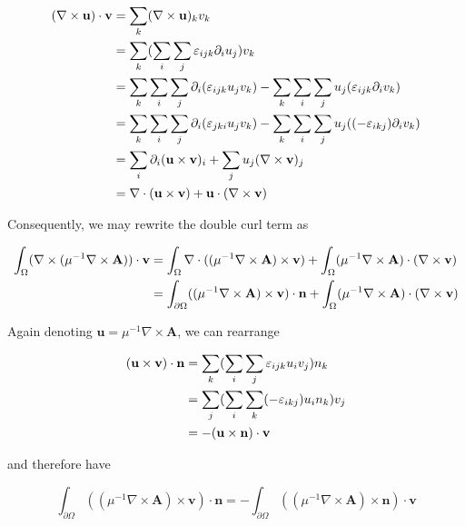 \documentclass[11pt, a4paper]{article}
\begin{document}
\begin{align}
    (\nabla \times \mathbf{u}) \cdot \mathbf{v} &= \sum_k (\nabla \times \mathbf{u})_k v_k \notag \\ 
    &= \sum_k (\sum_i \sum_j \varepsilon_{ijk} \partial_i u_j) v_k \notag \\ 
    &= \sum_k \sum_i \sum_j \partial_i (\varepsilon_{ijk} u_j v_k) - \sum_k \sum_i \sum_j u_j (\varepsilon_{ijk} \partial_i v_k) \notag \\ 
    &= \sum_k \sum_i \sum_j \partial_i (\varepsilon_{jki} u_j v_k) - \sum_k \sum_i \sum_j u_j ((-\varepsilon_{ikj}) \partial_i v_k) \notag \\ 
    &= \sum_i \partial_i (\mathbf{u} \times \mathbf{v})_i + \sum_j u_j (\nabla \times \mathbf{v})_j \notag \\ 
    &= \nabla \cdot (\mathbf{u} \times \mathbf{v}) + \mathbf{u} \cdot (\nabla \times \mathbf{v}) \label{equ:curlidentity} 
\end{align}

Consequently, we may rewrite the double curl term as 

\begin{align}
    \int_{\Omega} (\nabla \times ({\mu^{-1} \nabla \times \mathbf{A}})) \cdot \mathbf{v} &=
    \int_{\Omega} \nabla \cdot (({\mu^{-1} \nabla \times \mathbf{A}}) \times \mathbf{v})
    + \int_{\Omega} ({\mu^{-1} \nabla \times \mathbf{A}}) \cdot (\nabla \times \mathbf{v}) \notag \\
    &= \int_{\partial \Omega} (({\mu^{-1} \nabla \times \mathbf{A}}) \times \mathbf{v}) \cdot \mathbf{n}
    + \int_{\Omega} ({\mu^{-1} \nabla \times \mathbf{A}}) \cdot (\nabla \times \mathbf{v}) \notag \\
\end{align}

Again denoting $\mathbf{u} = \mu^{-1} \nabla \times \mathbf{A}$, we can rearrange 

\begin{align}
    (\mathbf{u} \times \mathbf{v}) \cdot \mathbf{n} &= \sum_k (\sum_i \sum_j \varepsilon_{ijk} u_i v_j) n_k \notag \\
     &= \sum_j (\sum_i \sum_k (-\varepsilon_{ikj}) u_i n_k) v_j \notag \\ 
     &= - (\mathbf{u} \times \mathbf{n}) \cdot \mathbf{v} 
\end{align}

and therefore have

\begin{equation}
    \int_{\partial \Omega} (({\mu^{-1} \nabla \times \mathbf{A}}) \times \mathbf{v}) \cdot \mathbf{n}
    = - \int_{\partial \Omega} (({\mu^{-1} \nabla \times \mathbf{A}}) \times \mathbf{n}) \cdot \mathbf{v}
\end{equation}
\end{document}
